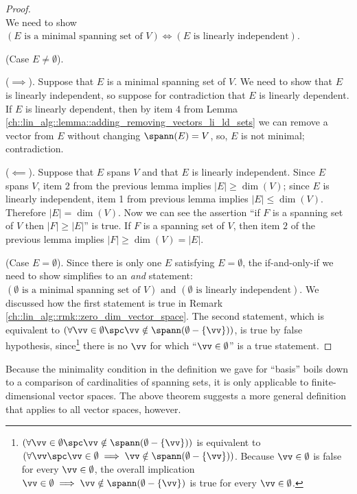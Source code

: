 \begin{proof}
    \mbox{} \\ \indent
    We need to show $(\text{$E$ is a minimal spanning set of $V$}) \iff (\text{$E$ is linearly independent})$.
    
    (Case $E \neq \emptyset$).
    
    \indent ($\implies$). Suppose that $E$ is a minimal spanning set of $V$. We need to show that $E$ is linearly independent, so suppose for contradiction that $E$ is linearly dependent. If $E$ is linearly dependent, then by item 4 from Lemma \ref{ch::lin_alg::lemma::adding_removing_vectors_li_ld_sets} we can remove a vector from $E$ without changing $\spann(E) = V$, so, $E$ is not minimal; contradiction.
    
    \indent ($\impliedby$). Suppose that $E$ spans $V$ and that $E$ is linearly independent. Since $E$ spans $V$, item 2 from the previous lemma
    implies $|E| \geq \dim(V)$; since $E$ is linearly independent, item 1 from previous lemma implies $|E| \leq \dim(V)$. Therefore $|E| = \dim(V)$. Now we can see the assertion ``if $F$ is a spanning set of $V$ then $|F| \geq |E|$'' is true. If $F$ is a spanning set of $V$, then item $2$ of the previous lemma implies $|F| \geq \dim(V) = |E|$.
    
    (Case $E = \emptyset$). Since there is only one $E$ satisfying $E = \emptyset$, the if-and-only-if we need to show simplifies to an \textit{and} statement: $(\text{$\emptyset$ is a minimal spanning set of $V$}) \text{ and } (\text{$\emptyset$ is linearly independent})$. We discussed how the first statement is true in Remark \ref{ch::lin_alg::rmk::zero_dim_vector_space}. The second statement, which is equivalent to $(\forall \vv \in \emptyset \spc \vv \notin \spann(\emptyset - \{\vv\}))$, is true by false hypothesis, since\footnote{$(\forall \vv \in \emptyset \spc \vv \notin \spann(\emptyset - \{\vv\}))$ is equivalent to $(\forall \vv \spc \vv \in \emptyset \implies \vv \notin \spann(\emptyset - \{\vv\}))$. Because $\vv \in \emptyset$ is false for every $\vv \in \emptyset$, the overall implication $\vv \in \emptyset \implies \vv \notin \spann(\emptyset - \{\vv\})$ is true for every $\vv \in \emptyset$.} there is no $\vv$ for which ``$\vv \in \emptyset$'' is a true statement.
    
    
\end{proof}

Because the minimality condition in the definition we gave for ``basis'' boils down to a comparison of cardinalities of spanning sets, it is only applicable to finite-dimensional vector spaces. The above theorem suggests a more general definition that applies to all vector spaces, however.

